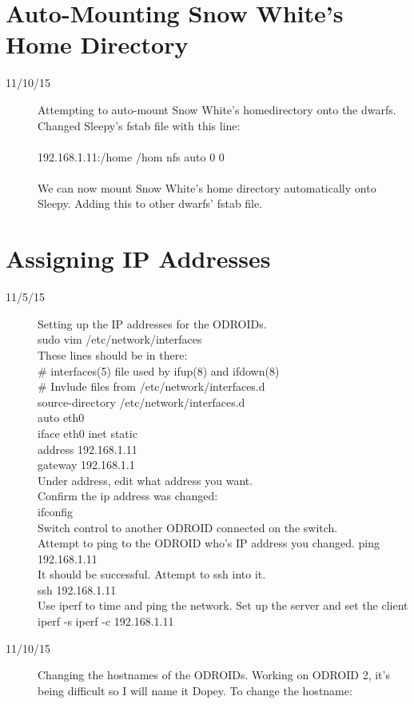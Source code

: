 \section{Auto-Mounting Snow White's Home Directory}
\begin{description}
\item [11/10/15] Attempting to auto-mount Snow White's homedirectory onto the dwarfs. Changed Sleepy's fstab file with this line: \\ \\
192.168.1.11:/home /hom nfs auto 0 0 \\ \\
We can now mount Snow White's home directory automatically onto Sleepy. Adding this to other dwarfs' fstab file.
\end{description}

\section{Assigning IP Addresses}
\begin{description}
\item [11/5/15] Setting up the IP addresses for the ODROIDs. \\
sudo vim /etc/network/interfaces \\
These lines should be in there: \\
\# interfaces(5) file used by ifup(8) and ifdown(8) \\
\# Invlude files from /etc/network/interfaces.d \\
source-directory /etc/network/interfaces.d \\
auto eth0 \\
iface eth0 inet static \\
address 192.168.1.11 \\
gateway 192.168.1.1 \\
Under address, edit what address you want.\\
Confirm the ip address was changed: \\
ifconfig \\
Switch control to another ODROID connected on the switch. \\
Attempt to ping to the ODROID who's IP address you changed.
ping 192.168.1.11 \\
It should be successful. Attempt to ssh into it. \\
ssh 192.168.1.11 \\
Use iperf to time and ping the network. Set up the server and set the client \\
iperf -s
iperf -c 192.168.1.11
\item [11/10/15] Changing the hostnames of the ODROIDs. Working on ODROID 2, it's being difficult so I will name it Dopey. To change the hostname: \\


\end{description}

